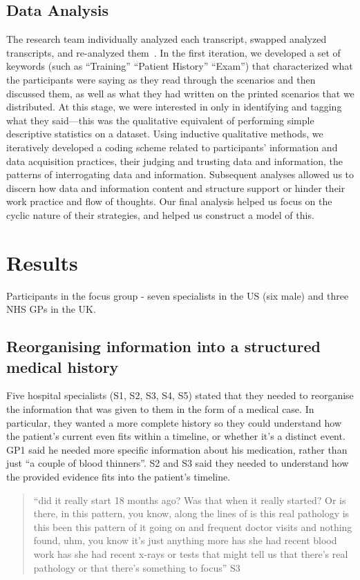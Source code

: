 \documentclass{sigchi}
\begin{document}
\subsection{Data Analysis}
The research team individually analyzed each transcript, swapped analyzed transcripts, and re-analyzed them~\cite{pope2000qualitative}.  In the first iteration, we developed a set of keywords (such as “Training” “Patient History” “Exam”) that characterized what the participants were saying as they read through the scenarios and then discussed them, as well as what they had written on the printed scenarios that we distributed. At this stage, we were interested in only in identifying and tagging what they said—this was the qualitative equivalent of performing simple descriptive statistics on a dataset.  Using inductive qualitative methods, \cite{corbin2014basics} we iteratively developed a coding scheme related to participants’ information and data acquisition practices, their judging and trusting data and information, the patterns of interrogating data and information. Subsequent analyses allowed us to discern how data and information content and structure support or hinder their work practice and flow of thoughts.  Our final analysis helped us focus on the cyclic nature of their strategies, and helped us construct a model of this.


\section{Results}

Participants in the focus group - seven specialists in the US (six male) and three NHS GPs in the UK.
    
\subsection{Reorganising information into a structured medical history}
Five hospital specialists (S1, S2, S3, S4, S5) stated that they needed to reorganise the information that was given to them in the form of a medical case. In particular, they wanted a more complete history so they could understand how the patient’s current even fits within a timeline, or whether it’s a distinct event. GP1 said he needed more specific information about his medication, rather than just ``a couple of blood thinners''. S2 and S3 said they needed to understand how the provided evidence fits into the patient's timeline.

\begin{quote}
    ``did it really start 18 months ago? Was that when it really started? Or is there, in this pattern, you know, along the lines of is this real pathology is this been this pattern of it going on and frequent doctor visits and nothing found, uhm, you know it’s just anything more has she had recent blood work has she had recent x-rays or tests that might tell us that there's real pathology or that there's something to focus'' S3
\end{quote}
\end{document}
